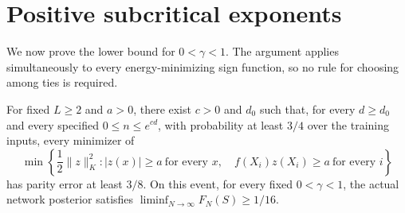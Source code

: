 \section{Positive subcritical exponents}
\label{sec:positive}
We now prove the lower bound for $0<\gamma<1$. The argument applies
simultaneously to every energy-minimizing sign function, so no rule
for choosing among ties is required.

\begin{theorem}
\label{thm:positive-subcritical}
For fixed $L\ge2$ and $a>0$, there exist $c>0$ and $d_0$ such that,
for every $d\ge d_0$ and every specified $0\le n\le e^{cd}$, with
probability at least $3/4$ over the training inputs, every minimizer of
\[
 \min\left\{\frac12\|z\|_K^2:
      |z(x)|\ge a\ \text{for every }x,\quad
      f(X_i)z(X_i)\ge a\ \text{for every }i\right\}
\]
has parity error at least $3/8$. On this event, for every fixed
$0<\gamma<1$, the actual network posterior satisfies
$\liminf_{N\to\infty}F_N(S)\ge1/16$.
\end{theorem}
